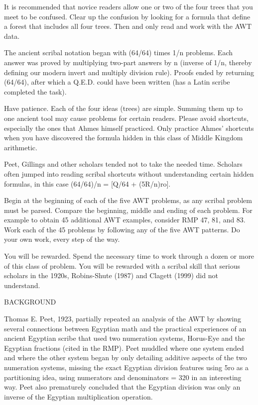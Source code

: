 \documentclass[12pt]{article}
\begin{document}
It is recommended that novice readers allow one or two of the four trees that you meet to be confused. Clear up the confusion by looking for a formula that define a forest that includes all four trees. Then and only read and work with the AWT data. 

The ancient scribal notation began with (64/64) times 1/n problems. Each answer was proved by multiplying two-part answers by n (inverse of 1/n, thereby defining our modern invert and multiply division rule).  Proofs ended by returning (64/64), after which a Q.E.D. could have been written (has a Latin scribe completed the task).

Have patience. Each of the four ideas (trees) are simple. Summing them up to one ancient tool may cause problems for certain readers. Please avoid shortcuts, especially the ones that Ahmes himself practiced. Only practice Ahmes' shortcuts when you have discovered the formula hidden in this class of Middle Kingdom arithmetic.

Peet, Gillings and other scholars tended not to take the needed time. Scholars often jumped into reading scribal shortcuts without understanding certain hidden formulas, in this case (64/64)/n = [Q/64 + (5R/n)ro].

Begin at the beginning of each of the five AWT problems, as any scribal problem must be parsed. Compare the beginning, middle and ending of each problem. For example to obtain 45 additional AWT examples, consider RMP 47, 81, and 83. Work each of the 45 problems by following any of the five AWT patterns. Do your own work, every step of the way.

You will be rewarded. Spend the necessary time to work through a dozen or more of this class of problem. You will be rewarded with a scribal skill that serious scholars in the 1920s, Robins-Shute (1987) and Clagett (1999) did not understand.

BACKGROUND

Thomas E. Peet, 1923, partially repeated an analysis of the AWT by showing several connections between Egyptian math and the practical experiences of an ancient Egyptian scribe that used two numeration systems, Horus-Eye and the Egyptian fractions (cited in the RMP). Peet muddled where one system ended and where the other system began by only detailing additive aspects of the two numeration systems, missing the exact Egyptian division features using 5ro as a partitioning idea, using numerators and denominators = 320 in an interesting way. Peet also prematurely concluded that the Egyptian division was only an inverse of the Egyptian multiplication operation.
\end{document}
